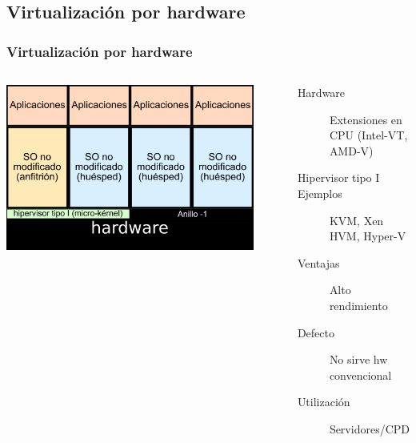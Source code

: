\documentclass{beamer}
\begin{document}
\subsection{Virtualización por hardware}
\begin{frame} \frametitle{Virtualización por hardware}
  \begin{columns}
    \begin{center}
    \includegraphics[width=0.9\textwidth]{virt_hw.png}      
    \end{center}
    \begin{description}
    \item[Hardware] Extensiones en CPU (Intel-VT, AMD-V)
    \item[Hipervisor tipo I]
    \item[Ejemplos] KVM, Xen HVM, Hyper-V
    \item [Ventajas] Alto rendimiento
    \item[Defecto] No sirve hw convencional
    \item[Utilización] Servidores/CPD
    \end{description}
  \end{columns}
\end{frame}
\end{document}
